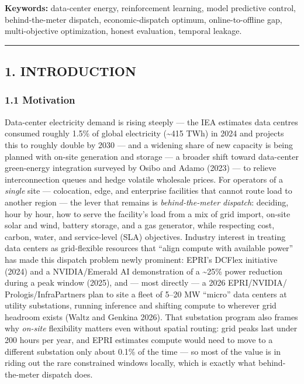 \documentclass[
  11pt,
]{article}
\begin{document}
\textbf{Keywords:} data-center energy, reinforcement learning, model
predictive control, behind-the-meter dispatch, economic-dispatch
optimum, online-to-offline gap, multi-objective optimization, honest
evaluation, temporal leakage.

\begin{center}\rule{0.5\linewidth}{0.5pt}\end{center}

\subsection{1. INTRODUCTION}\label{introduction}

\subsubsection{1.1 Motivation}\label{motivation}

Data-center electricity demand is rising steeply --- the IEA estimates
data centres consumed roughly 1.5\% of global electricity
(\textasciitilde415 TWh) in 2024 and projects this to roughly double by
2030 --- and a widening share of new capacity is being planned with
on-site generation and storage --- a broader shift toward data-center
green-energy integration surveyed by Osibo and Adamo (2023) --- to
relieve interconnection queues and hedge volatile wholesale prices. For
operators of a \emph{single} site --- colocation, edge, and enterprise
facilities that cannot route load to another region --- the lever that
remains is \emph{behind-the-meter dispatch}: deciding, hour by hour, how
to serve the facility's load from a mix of grid import, on-site solar
and wind, battery storage, and a gas generator, while respecting cost,
carbon, water, and service-level (SLA) objectives. Industry interest in
treating data centers as grid-flexible resources that ``align compute
with available power'' has made this dispatch problem newly prominent:
EPRI's DCFlex initiative (2024) and a NVIDIA/Emerald AI demonstration of
a \textasciitilde25\% power reduction during a peak window (2025), and
--- most directly --- a 2026 EPRI/NVIDIA/ Prologis/InfraPartners plan to
site a fleet of 5--20 MW ``micro'' data centers at utility substations,
running inference and shifting compute to wherever grid headroom exists
(Waltz and Genkina 2026). That substation program also frames why
\emph{on-site} flexibility matters even without spatial routing: grid
peaks last under 200 hours per year, and EPRI estimates compute would
need to move to a different substation only about 0.1\% of the time ---
so most of the value is in riding out the rare constrained windows
locally, which is exactly what behind-the-meter dispatch does.
\end{document}
